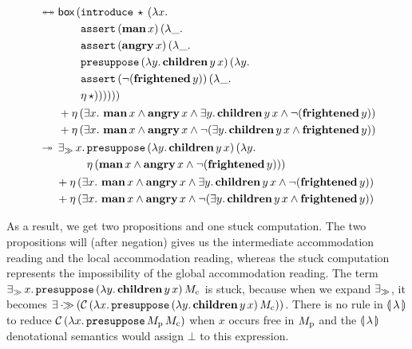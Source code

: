 \begin{align*}
   &\twoheadleftarrow \mathrel{\mkern-15mu} \twoheadrightarrow \begin{aligned}[t]
      &\begin{aligned}[t]
         \textsf{box}\,(&\mathtt{introduce}\,\star\,(\lambda x.\,  \\
                    &\mathtt{assert}\,(\textbf{man}\,x)\,(\lambda \_.\,  \\
                    &\mathtt{assert}\,(\textbf{angry}\,x)\,(\lambda \_.\,  \\
                    &\mathtt{presuppose}\,(\lambda y.\, \textbf{children}\,y\,x)\,(\lambda y.\,  \\
                    &\mathtt{assert}\,(\lnot (\textbf{frightened}\,y))\,(\lambda \_.\,  \\
                    &\eta\,\star))))))
       \end{aligned} \\
      &+ \eta\,(\exists x.\ \textbf{man}\,x \land \textbf{angry}\,x \land
                \exists y.\, \textbf{children}\,y\,x \land
                \lnot (\textbf{frightened}\,y)) \\
      &+ \eta\,(\exists x.\ \textbf{man}\,x \land \textbf{angry}\,x \land
                \lnot (\exists y.\, \textbf{children}\,y\,x \land \textbf{frightened}\,y))
    \end{aligned} \\
   &\twoheadrightarrow \begin{aligned}[t]
      &\mathop{\exists_\gg} x.\, \begin{aligned}[t]
          &\mathtt{presuppose}\,(\lambda y.\, \textbf{children}\,y\,x)\,(\lambda y.\,  \\
          &\eta\,(\textbf{man}\,x \land \textbf{angry}\,x \land \lnot (\textbf{frightened}\,y)))
        \end{aligned} \\
      &+ \eta\,(\exists x.\ \textbf{man}\,x \land \textbf{angry}\,x \land
                \exists y.\, \textbf{children}\,y\,x \land
                \lnot (\textbf{frightened}\,y)) \\
      &+ \eta\,(\exists x.\ \textbf{man}\,x \land \textbf{angry}\,x \land
                \lnot (\exists y.\, \textbf{children}\,y\,x \land \textbf{frightened}\,y))
    \end{aligned}
\end{align*}

As a result, we get two propositions and one stuck computation. The two
propositions will (after negation) gives us the intermediate accommodation
reading and the local accommodation reading, whereas the stuck computation
represents the impossibility of the global accommodation reading. The term
$\mathop{\exists_\gg} x.\,
\mathtt{presuppose}\,(\lambda y.\, \textbf{children}\,y\,x)\,M_{\mathrm{c}}$ is
stuck, because when we expand $\mathop{\exists_\gg}$, it becomes
$\exists \mathbin{\cdot\!\!\gg}
(\mathcal{C}\,(\lambda x.\, \mathtt{presuppose}\,(\lambda y.\, \textbf{children}\,y\,x)\,M_{\mathrm{c}}))$. There
is no rule in $\llparenthesis \, \lambda \, \rrparenthesis$ to reduce
$\mathcal{C}\,(\lambda x.\, \mathtt{presuppose}\,M_{\mathrm{p}}\,M_{\mathrm{c}})$ when $x$
occurs free in $M_{\mathrm{p}}$ and the $\llparenthesis \, \lambda \, \rrparenthesis$ denotational
semantics would assign $\bot$ to this expression.

